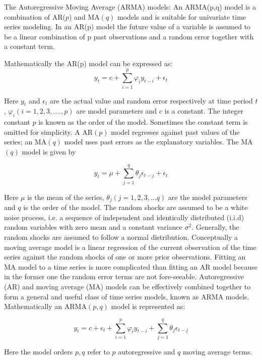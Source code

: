 The Autoregressive Moving Average (ARMA) models:
An ARMA(p,q) model is a combination of AR($p$) and MA$(q)$ models and is suitable for univariate time series modeling. In an AR(p) model the future value of a variable is assumed to be a linear combination of p past observations and a random error together with a constant term. 

Mathematically the AR(p) model can be expressed as:
\begin{equation}
y_t = c+\sum_{i=1}^{p} \varphi_{i} y_{t-i}+\epsilon_{t}
\end{equation}

Here $y_t$ and $\epsilon_t$ are the actual value and random error respectively at time period $t$, $\varphi_{i} (i=1,2,3,....,p)$ are model parameters and $c$ is a constant. The integer constant $p$ is known as the order of the model. Sometimes the constant term is omitted for simplicity. A AR$(p)$ model regresses against past values of the series; an MA$(q)$ model uses past errors as the explanatory variables. The MA$(q)$ model is given by

\begin{equation}
y_t = \mu+\sum_{j=1}^{q} \theta_{j} \epsilon_{t-j} + \epsilon_{t}
\end{equation}

Here $\mu$ is the mean of the series, $\theta_j (j=1,2,3,...q)$ are the model parameters and $q$ is the order of the model. The random shocks are assumed to be a white noise process, i.e. a sequence of independent and identically distributed (i.i.d) random variables with zero mean and a constant variance $\sigma^{2}$. Generally, the random shocks are assumed to follow a normal distribution. Conceptually a moving average model is a linear regression of the current observation of the time series against the random shocks of one or more prior observations. Fitting an MA model to a time series is more complicated than fitting an AR model because in the former one the random error terms are not fore-seeable.  Autoregressive (AR) and moving average (MA) models can be effectively combined together to form a general and useful class of time series models, known as ARMA models. Mathematically an ARMA$(p,q)$ model is represented as:

\begin{equation}
y_t = c+\epsilon_{t}+\sum_{i=1}^{p} \varphi_{i} y_{t-i} +\sum_{j=1}^{q} \theta_{j} \epsilon_{t-j}
\end{equation}

Here the model orders $p,q$ refer to $p$ autoregressive and $q$ moving average terms. 

